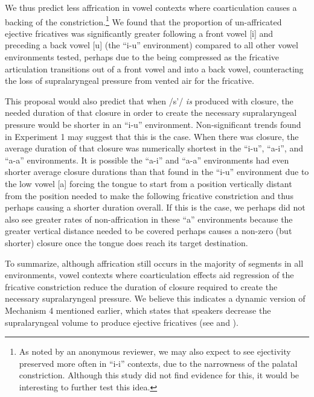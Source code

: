\documentclass[output=paper,newtxmath,modfonts,nonflat,final]{langsci/langscibook}
\begin{document}
We thus predict less affrication in vowel contexts where coarticulation causes a backing of the constriction.\footnote{As noted by an anonymous reviewer, we may also expect to see ejectivity preserved more often in “i-i” contexts, due to the narrowness of the palatal constriction. Although this study did not find evidence for this, it would be interesting to further test this idea.} We found that the proportion of un-affricated ejective fricatives was significantly greater following a front vowel [i] and preceding a back vowel [u] (the “i-u” environment) compared to all other vowel environments tested, perhaps due to the  being compressed as the fricative articulation transitions out of a front vowel and into a back vowel, counteracting the loss of supralaryngeal pressure from vented air for the fricative. 

This proposal would also predict that when /s’/ \textit{is} produced with closure, the needed duration of that closure in order to create the necessary supralaryngeal pressure would be shorter in an “i-u” environment. Non-significant trends found in Experiment 1 may suggest that this is the case. When there was closure, the average duration of that closure was numerically shortest in the “i-u”, “a-i”, and “a-a” environments. It is possible the “a-i” and “a-a” environments had even shorter average closure durations than that found in the “i-u” environment due to the low vowel [a] forcing the tongue to start from a position vertically distant from the position needed to make the following fricative constriction and thus perhaps causing a shorter duration overall. If this is the case, we perhaps did not also see greater rates of non-affrication in these “a” environments because the greater vertical distance needed to be covered perhaps causes a non-zero (but shorter) closure once the tongue does reach its target destination.

To summarize, although affrication still occurs in the majority of segments in all environments, vowel contexts where coarticulation effects aid regression of the fricative constriction reduce the duration of closure required to create the necessary supralaryngeal pressure. We believe this indicates a dynamic version of Mechanism 4 mentioned earlier, which states that speakers decrease the supralaryngeal volume to produce ejective fricatives (see  and \citealt{demolin2002search}).
\end{document}
